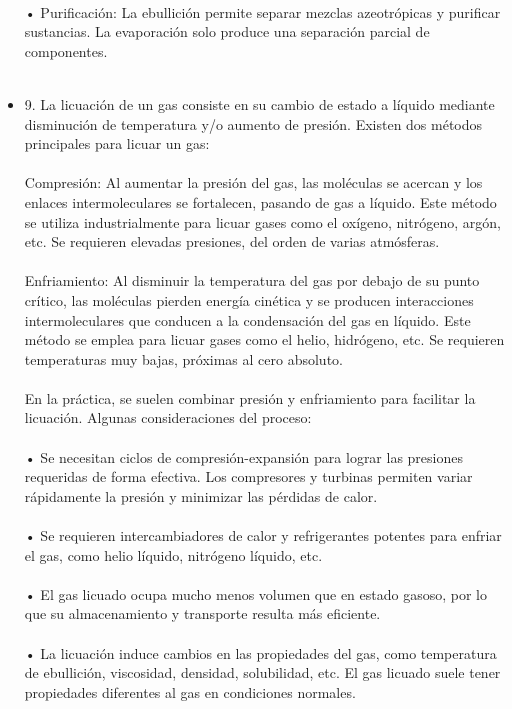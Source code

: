 \documentclass{article}
\begin{document}
\begin{itemize}
\\
• Purificación: La ebullición permite separar mezclas azeotrópicas y purificar sustancias. La evaporación solo produce una separación parcial de componentes.\\
\\
\item{9.}
La licuación de un gas consiste en su cambio de estado a líquido mediante disminución de temperatura y/o aumento de presión. Existen dos métodos principales para licuar un gas:\\
\\
Compresión: Al aumentar la presión del gas, las moléculas se acercan y los enlaces intermoleculares se fortalecen, pasando de gas a líquido. Este método se utiliza industrialmente para licuar gases como el oxígeno, nitrógeno, argón, etc. Se requieren elevadas presiones, del orden de varias atmósferas.\\
\\
Enfriamiento: Al disminuir la temperatura del gas por debajo de su punto crítico, las moléculas pierden energía cinética y se producen interacciones intermoleculares que conducen a la condensación del gas en líquido. Este método se emplea para licuar gases como el helio, hidrógeno, etc. Se requieren temperaturas muy bajas, próximas al cero absoluto.\\
\\
En la práctica, se suelen combinar presión y enfriamiento para facilitar la licuación. Algunas consideraciones del proceso:\\
\\
• Se necesitan ciclos de compresión-expansión para lograr las presiones requeridas de forma efectiva. Los compresores y turbinas permiten variar rápidamente la presión y minimizar las pérdidas de calor.\\
\\
• Se requieren intercambiadores de calor y refrigerantes potentes para enfriar el gas, como helio líquido, nitrógeno líquido, etc.\\
\\
• El gas licuado ocupa mucho menos volumen que en estado gasoso, por lo que su almacenamiento y transporte resulta más eficiente.\\
\\
• La licuación induce cambios en las propiedades del gas, como temperatura de ebullición, viscosidad, densidad, solubilidad, etc. El gas licuado suele tener propiedades diferentes al gas en condiciones normales.\\

\end{itemize}
\end{document}
